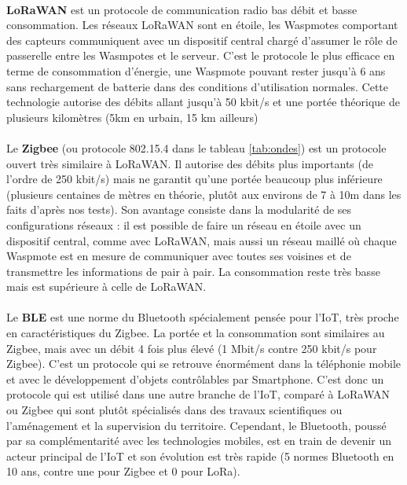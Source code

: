    \paragraph{}\textbf{LoRaWAN} est un protocole de communication radio bas débit et basse consommation. Les réseaux LoRaWAN sont en étoile, les Waspmotes comportant des capteurs communiquent avec un dispositif central chargé d'assumer le rôle de passerelle entre les Wasmpotes et le serveur.  C'est le protocole le plus efficace en terme de consommation d'énergie, une Waspmote pouvant rester jusqu'à 6 ans sans rechargement de batterie dans des conditions d'utilisation normales. Cette technologie autorise des débits allant jusqu'à 50 kbit/s et une portée théorique de plusieurs kilomètres (5km en urbain, 15 km ailleurs)

    \paragraph{}Le \textbf{Zigbee} (ou protocole 802.15.4 dans le tableau \ref{tab:ondes}) est un protocole ouvert très similaire à LoRaWAN. Il autorise des débits plus importants (de l'ordre de 250 kbit/s) mais ne garantit qu'une portée beaucoup plus inférieure (plusieurs centaines de mètres en théorie, plutôt aux environs de 7 à 10m dans les faits d'après nos tests). Son avantage consiste dans la modularité de ses configurations réseaux : il est possible de faire un réseau en étoile avec un dispositif central, comme avec LoRaWAN, mais aussi un réseau maillé où chaque Waspmote est en mesure de communiquer avec toutes ses voisines et de transmettre les informations de pair à pair. La consommation reste très basse mais est supérieure à celle de LoRaWAN.

    \paragraph{} Le \textbf{BLE}  est une norme du Bluetooth spécialement pensée pour l'IoT, très proche en caractéristiques du Zigbee. La portée et la consommation sont similaires au Zigbee, mais avec un débit 4 fois plus élevé (1 Mbit/s contre 250 kbit/s pour Zigbee). C'est un protocole qui se retrouve énormément dans la téléphonie mobile et avec le développement d'objets contrôlables par Smartphone. C'est donc un protocole qui est utilisé dans une autre branche de l'IoT, comparé à LoRaWAN ou Zigbee qui sont plutôt spécialisés dans des travaux scientifiques ou l'aménagement et la supervision du territoire. Cependant, le Bluetooth, poussé par sa complémentarité avec les technologies mobiles, est en train de devenir un acteur principal de l'IoT et son évolution est très rapide (5 normes Bluetooth en 10 ans, contre une pour Zigbee et 0 pour LoRa).

